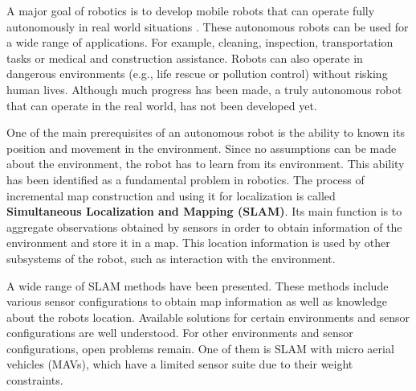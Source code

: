 A major goal of robotics is to develop mobile robots that can operate fully autonomously in real world situations \cite{murphy2000introduction}.
These autonomous robots can be used for a wide range of applications.
For example, cleaning, inspection, transportation tasks or medical and construction assistance.
Robots can also operate in dangerous environments (e.g., life rescue or pollution control) without risking human lives.
Although much progress has been made, a truly autonomous robot that can operate in the real world, has not been developed yet.

One of the main prerequisites of an autonomous robot is the ability to known its position and movement in the environment.
Since no assumptions can be made about the environment, the robot has to learn from its environment.
This ability has been identified as a fundamental problem in robotics.
The process of incremental map construction and using it for localization is called \textbf{Simultaneous Localization and Mapping (SLAM)}.
Its main function is to aggregate observations obtained by sensors in order to obtain information of the environment and store it in a map.
This location information is used by other subsystems of the robot, such as interaction with the environment.

A wide range of SLAM methods have been presented.
These methods include various sensor configurations to obtain map information as well as knowledge about the robots location.
Available solutions for certain environments and sensor configurations are well understood.
For other environments and sensor configurations, open problems remain.
One of them is SLAM with micro aerial vehicles (MAVs), which have a limited sensor suite due to their weight constraints.

